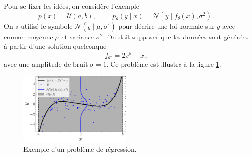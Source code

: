 Pour se fixer les idées, on considère l'exemple  
\begin{equation}\label{eq:loi generative}
        p(x) = \mathcal{U}(a, b), \hspace{1cm} p_\theta(y \mid x) = \mathcal{N}(y \mid f_\theta(x), \sigma^2)\, .
\end{equation}
On a utilisé le symbole $\mathcal{N}(y \mid \mu, \sigma^2)$ pour décrire une loi normale sur $y$ avec comme moyenne $\mu$ et variance $\sigma^2$. 
On doit supposer que les données sont générées à partir d'une solution quelconque 
\begin{equation}
        f_{\theta^{\star}} = 2x^5 - x\, ,
\end{equation}
avec une amplitude de bruit $\sigma=1$. Ce problème est illustré à la figure \ref{fig:toy problem}.
\begin{figure}[th!]
        \centering
        \includegraphics[width=0.5\textwidth]{notebooks/toy_problem}
        \caption{Exemple d'un problème de régression.}
        \label{fig:toy problem}
\end{figure}

